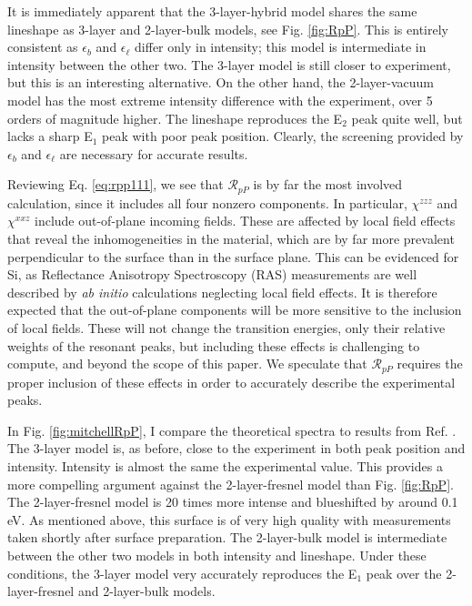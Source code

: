 It is immediately apparent that the 3-layer-hybrid model shares the same lineshape as 3-layer and 2-layer-bulk models, see Fig. \ref{fig:RpP}. This is entirely consistent as $\epsilon_{b}$ and $\epsilon_{\ell}$ differ only in intensity; this model is intermediate in intensity between the other two. The 3-layer model is still closer to experiment, but this is an interesting alternative. On the other hand, the 2-layer-vacuum model has the most extreme intensity difference with the experiment, over 5 orders of magnitude higher. The lineshape reproduces the E$_{2}$ peak quite well, but lacks a sharp E$_{1}$ peak with poor peak position. Clearly, the screening provided by $\epsilon_{b}$ and $\epsilon_{\ell}$ are necessary for accurate results.

Reviewing Eq. \eqref{eq:rpp111}, we see that $\mathcal{R}_{pP}$ is by far the most involved calculation, since it includes all four nonzero components. In particular, $\chi^{zzz}$ and $\chi^{xxz}$ include out-of-plane incoming fields. These are affected by local field effects\cite{tancognedejean:tel-01235611} that reveal the inhomogeneities in the material, which are by far more prevalent perpendicular to the surface than in the surface plane. This can be evidenced for Si, as Reflectance Anisotropy Spectroscopy (RAS) measurements are well described by \emph{ab initio} calculations neglecting local field effects.\cite{palummoPRB99, gaalPRB09} It is therefore expected that the out-of-plane components will be more sensitive to the inclusion of local fields. These will not change the transition energies, only their relative weights of the resonant peaks,\cite{tancognedejean:tel-01235611} but including these effects is challenging to compute,\cite{nicolasPRB15} and beyond the scope of this paper. We speculate that $\mathcal{R}_{pP}$ requires the proper inclusion of these effects in order to accurately describe the experimental peaks.

In Fig. \ref{fig:mitchellRpP}, I compare the theoretical spectra to results from Ref. \cite{mitchellSS01}. The 3-layer model is, as before, close to the experiment in both peak position and intensity. Intensity is almost the same the experimental value. This provides a more compelling argument against the 2-layer-fresnel model than Fig. \ref{fig:RpP}. The 2-layer-fresnel model is 20 times more intense and blueshifted by around 0.1 eV. As mentioned above, this surface is of very high quality with measurements taken shortly after surface preparation. The 2-layer-bulk model is intermediate between the other two models in both intensity and lineshape. Under these conditions, the 3-layer model very accurately reproduces the E$_{1}$ peak over the 2-layer-fresnel and 2-layer-bulk models.

